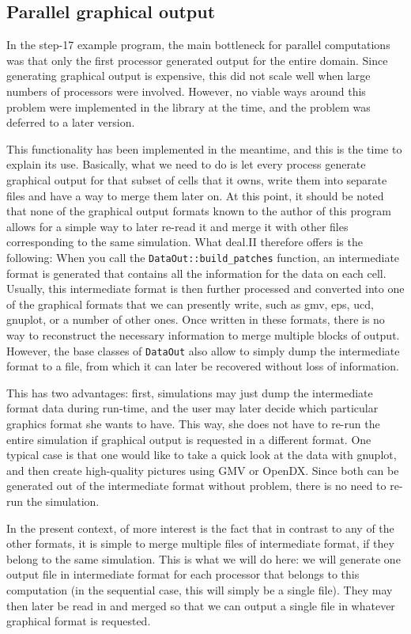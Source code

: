 \documentclass{article}
\begin{document}
\subsection*{Parallel graphical output}

In the step-17 example program, the main bottleneck for parallel computations
was that only the first processor generated output for the entire domain.
Since generating graphical output is expensive, this did not scale well when
large numbers of processors were involved. However, no viable ways around this
problem were implemented in the library at the time, and the problem was
deferred to a later version.

This functionality has been implemented in the meantime, and this is the time
to explain its use. Basically, what we need to do is let every process
generate graphical output for that subset of cells that it owns, write them
into separate files and have a way to merge them later on. At this point, it
should be noted that none of the graphical output formats known to the author
of this program allows for a simple way to later re-read it and merge it with
other files corresponding to the same simulation. What deal.II therefore
offers is the following: When you call the \texttt{DataOut::build\_patches}
function, an intermediate format is generated that contains all the
information for the data on each cell. Usually, this intermediate format is
then further processed and converted into one of the graphical formats that we
can presently write, such as gmv, eps, ucd, gnuplot, or a number of other
ones. Once written in these formats, there is no way to reconstruct the
necessary information to merge multiple blocks of output. However, the base
classes of \texttt{DataOut} also allow to simply dump the intermediate format
to a file, from which it can later be recovered without loss of information.

This has two advantages: first, simulations may just dump the intermediate
format data during run-time, and the user may later decide which particular
graphics format she wants to have. This way, she does not have to re-run the
entire simulation if graphical output is requested in a different format. One
typical case is that one would like to take a quick look at the data with
gnuplot, and then create high-quality pictures using GMV or OpenDX. Since both
can be generated out of the intermediate format without problem, there is no
need to re-run the simulation.

In the present context, of more interest is the fact that in contrast to any
of the other formats, it is simple to merge multiple files of intermediate
format, if they belong to the same simulation. This is what we will do here:
we will generate one output file in intermediate format for each processor
that belongs to this computation (in the sequential case, this will simply be
a single file). They may then later be read in and merged so that we can
output a single file in whatever graphical format is requested.
\end{document}
